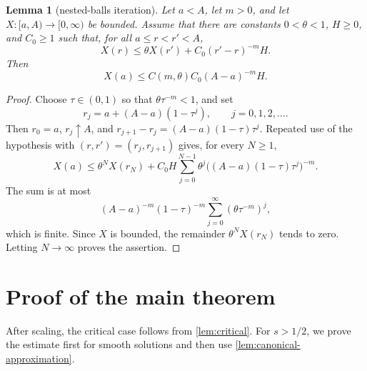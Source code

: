 \documentclass[reqno]{amsart}
\numberwithin{equation}{section}
\theoremstyle{plain}
\newtheorem{lemma}[theorem]{Lemma}
\theoremstyle{definition}
\theoremstyle{remark}
\newcommand{\rev}[1]{#1}
\begin{document}
\begin{lemma}[nested-balls iteration]\label{lem:nested-balls}
Let $a<A$, let $m>0$, and let $X:[a,A)\to[0,\infty)$ be bounded.
Assume that there are constants $0<\theta<1$, $H\ge0$, and
$C_0\ge1$ such that, for all $a\le r<r'<A$,
\[
 X(r)\le \theta X(r')+C_0(r'-r)^{-m}H.
\]
Then
\[
 X(a)\le C(m,\theta)C_0(A-a)^{-m}H.
\]
\end{lemma}

\begin{proof}
Choose $\tau\in(0,1)$ so that $\theta\tau^{-m}<1$, and set
\[
 r_j=a+(A-a)(1-\tau^j),\qquad j=0,1,2,\ldots.
\]
Then $r_0=a$, $r_j\uparrow A$, and
$r_{j+1}-r_j=(A-a)(1-\tau)\tau^j$.  Repeated use of the hypothesis
with $(r,r')=(r_j,r_{j+1})$ gives, for every $N\ge1$,
\[
 X(a)\le \theta^NX(r_N)+C_0H\sum_{j=0}^{N-1}
 \theta^j\bigl((A-a)(1-\tau)\tau^j\bigr)^{-m}.
\]
The sum is at most
\[
 (A-a)^{-m}(1-\tau)^{-m}
 \sum_{j=0}^{\infty}(\theta\tau^{-m})^j,
\]
which is finite.  Since $X$ is bounded, the remainder
$\theta^NX(r_N)$ tends to zero.  Letting $N\to\infty$ proves the
assertion.
\end{proof}

\section{Proof of the main theorem}\label{sec:proof}

\rev{After scaling, the critical case follows from
\cref{lem:critical}.  For $s>1/2$, we prove the estimate first for smooth
solutions and then use \cref{lem:canonical-approximation}.}
\end{document}
